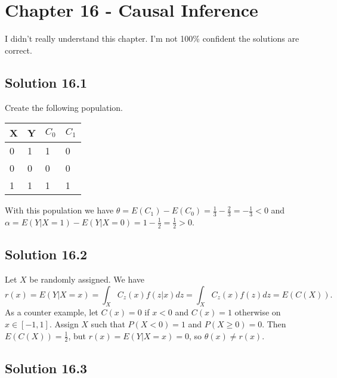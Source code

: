 \section*{Chapter 16 - Causal Inference}

I didn't really understand this chapter.
I'm not 100\% confident the solutions are correct.

\subsection*{Solution 16.1}

Create the following population.

\begin{table}[H]
    \centering
    \begin{tabular}{l|l||l|l}
    X & Y & $C_0$ & $C_1$ \\ \hline \hline
    0 & 1 & 1    & 0    \\ \hline
    0 & 0 & 0    & 0    \\ \hline
    1 & 1 & 1    & 1
    \end{tabular}
\end{table}
With this population we have $\theta = E(C_1) - E(C_0) = \frac{1}{3} - \frac{2}{3} = -\frac{1}{3} < 0$ and $\alpha = E(Y|X=1) - E(Y|X=0) = 1 - \frac{1}{2} = \frac{1}{2} > 0$.


\subsection*{Solution 16.2}

Let $X$ be randomly assigned.
We have
\begin{equation*}
    r(x) = E(Y|X = x)
        = \int_{X} C_{z}(x) f(z|x) dz
        = \int_{X} C_{z}(x) f(z) dz
        = E(C(X)).
\end{equation*}
As a counter example, let $C(x) = 0$ if $x < 0$ and $C(x) = 1$ otherwise on $x \in [-1, 1]$.
Assign $X$ such that $P(X < 0) = 1$ and $P(X \geq 0) = 0$.
Then $E(C(X)) = \frac{1}{2}$, but $r(x) = E(Y|X = x) = 0$, so $\theta(x) \neq r(x)$.


\subsection*{Solution 16.3}

